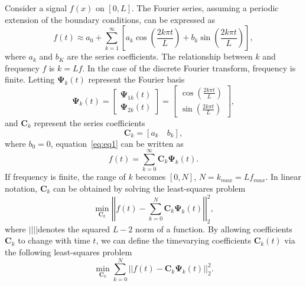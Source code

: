 Consider a signal $f(x)$ on $[0,L]$. The Fourier series, assuming a
periodic extension of the boundary conditions, can be expressed as
      \begin{equation}
          f(t)\approx a_{0}+\sum_{k=1}^{\infty}\left[ a_{k} \cos \left( \frac{2k\pi t}{L} \right)+b_{k} \sin \left( \frac{2k\pi t}{L}\right)\right] ,
        \label{eq:eq2}
      \end{equation} 
where $a_{k}$ and $b_{K}$ are the series coefficients. The relationship between
$k$ and frequency $f$ is $k=Lf$. In the case of the discrete Fourier transform, 
frequency is finite. Letting $ \mathbf{\Psi}_{k}(t)$ represent the Fourier basis
      \begin{equation}
          \mathbf{\Psi}_{k}(t) = \left[\begin{array}{ll} \mathbf{\Psi}_{1k}(t) \\ \mathbf{\Psi}_{2k}(t) \end{array} \right] = \left[\begin{array}{ll} \cos \left( \frac{2k \pi t}{L} \right) \\ \sin \left( \frac{2k \pi t}{L}\right) \end{array} \right],
        \label{eq:eq3}
      \end{equation}
and $\mathbf{C}_k$ represent the series coefficients
      \begin{equation}
          \mathbf{C}_{k} = \left[a_{k} \quad b_{k}\right],
        \label{eq:eq4}
      \end{equation}
where $b_{0}=0$, equation~\ref{eq:eq1} can be written as
      \begin{equation}
          f(t)=\sum_{k=0}^{\infty}\mathbf{C}_{k}\mathbf{\Psi}_{k}(t).
        \label{eq:eq5}
      \end{equation}
If frequency is finite, the range of $k$ becomes $[0,N]$,
$N = k_{max} = Lf_{max}$. In linear notation, $\mathbf{C}_k$ can be obtained by solving
the least-squares problem
      \begin{equation}
          \min_{\mathbf{C}_{k}}\left| \left| f(t)-\sum_{k=0}^{N} \mathbf{C}_k \mathbf{\Psi}_{k}(t)\right| \right|_{2}^{2},
        \label{eq:eq6}
      \end{equation}
where $\left| \left| \right| \right|$denotes the squared $L-2$ norm of a function. By allowing
coefficients $\mathbf{C}_k$ to change with time $t$, we can define the timevarying
coefficients $\mathbf{C}_{k}(t)$ via the following least-squares problem
      \begin{equation}
          \min_{\mathbf{C}_{k}}\sum_{k=0}^{N}\left| \left| f(t)-\mathbf{C}_{k}\mathbf{\Psi}_{k}(t)\right|\right| _{2}^{2}.
        \label{eq:eq7}
      \end{equation}
